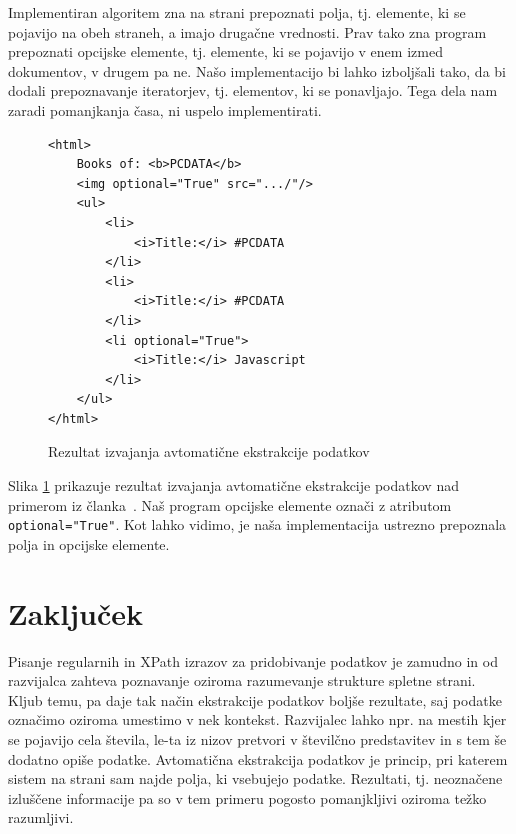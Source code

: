 \documentclass[conference]{IEEEtran}
\begin{document}
	Implementiran algoritem zna na strani prepoznati polja, tj. elemente, ki se pojavijo na obeh straneh, a imajo drugačne vrednosti. Prav tako zna program prepoznati opcijske elemente, tj. elemente, ki se pojavijo v enem izmed dokumentov, v drugem pa ne. Našo implementacijo bi lahko izboljšali tako, da bi dodali prepoznavanje iteratorjev, tj. elementov, ki se ponavljajo. Tega dela nam zaradi pomanjkanja časa, ni uspelo implementirati.
	
	\begin{figure}
		\centering
	\begin{verbatim}
<html>
    Books of: <b>PCDATA</b>
    <img optional="True" src=".../"/>
    <ul>
        <li>
            <i>Title:</i> #PCDATA
        </li>
        <li>
            <i>Title:</i> #PCDATA
        </li>
        <li optional="True">
            <i>Title:</i> Javascript
        </li>
    </ul>
</html>
	\end{verbatim}
	\caption{Rezultat izvajanja avtomatične ekstrakcije podatkov}
	\label{fig:automatic}
	\end{figure}

	Slika \ref{fig:automatic} prikazuje rezultat izvajanja avtomatične ekstrakcije podatkov nad primerom iz članka~\cite{roadrunner}. Naš program opcijske elemente označi z atributom \texttt{optional="True"}. Kot lahko vidimo, je naša implementacija ustrezno prepoznala polja in opcijske elemente.
	
%						
	
	\section{Zaključek}
	
	Pisanje regularnih in XPath izrazov za pridobivanje podatkov je zamudno in od razvijalca zahteva poznavanje oziroma razumevanje strukture spletne strani. Kljub temu, pa daje tak način ekstrakcije podatkov boljše rezultate, saj podatke označimo oziroma umestimo v nek kontekst. Razvijalec lahko npr. na mestih kjer se pojavijo cela števila, le-ta iz nizov pretvori v številčno predstavitev in s tem še dodatno opiše podatke. Avtomatična ekstrakcija podatkov je princip, pri katerem sistem na strani sam najde polja, ki vsebujejo podatke. Rezultati, tj. neoznačene izluščene informacije pa so v tem primeru pogosto pomanjkljivi oziroma težko razumljivi.
	
\end{document}

